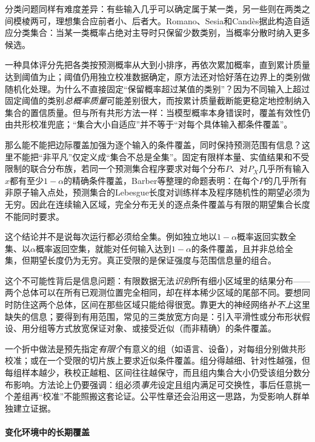 分类问题同样有难度差异：有些输入几乎可以确定属于某一类，另一些则在两类之间模棱两可，理想集合应前者小、后者大。Romano、Sesia和Candès据此构造自适应分类集合：当某一类概率占绝对主导时只保留少数类别，当概率分散时纳入更多候选。

一种具体评分先把各类按预测概率从大到小排序，再依次累加概率，直到累计质量达到阈值为止；阈值仍用独立校准数据确定，原方法还对恰好落在边界上的类别做随机化处理。为什么不直接固定“保留概率超过某值的类别”？因为不同输入上超过固定阈值的类别\emph{总概率质量}可能差别很大，而按累计质量截断能更稳定地控制纳入集合的置信质量。但与所有共形方法一样：当模型概率本身错误时，覆盖有效性仍由共形校准兜底；“集合大小自适应”并不等于“对每个具体输入都条件覆盖”。

那么能不能把边际覆盖加强为逐个输入的条件覆盖，同时保持预测范围有信息？这里不能把“非平凡”仅定义成“集合不总是全集”。固定有限样本量、实值结果和不受限制的联合分布族，若同一个预测集合程序要求对每个分布$P$、对$P_X$几乎所有输入$x$都有至少$1-\alpha$的精确条件覆盖，Barber等整理的命题表明：在每个$P$的几乎所有非原子输入点处，预测集合的Lebesgue长度对训练样本及程序随机性的期望必须为无穷。因此在连续输入区域，完全分布无关的逐点条件覆盖与有限的期望集合长度不能同时要求。

这个结论并不是说每次运行都必须给全集。例如独立地以$1-\alpha$概率返回实数全集、以$\alpha$概率返回空集，就能对任何输入达到$1-\alpha$的条件覆盖，且并非总给全集，但期望长度仍为无穷。真正受限的是保证强度与范围信息量的组合。

这个不可能性背后是信息问题：有限数据无法\emph{识别}所有细小区域里的结果分布——两个总体可以在所有已观测位置完全相同，却在样本稀少区域的尾部不同。要想同时防住这两个总体，区间在那些区域只能给得很宽。靠更大的神经网络\emph{补不上}这里缺失的信息；要得到有用范围，常见的三类放宽方向是：引入平滑性或分布形状假设、用分组等方式放宽保证对象、或接受近似（而非精确）的条件覆盖。

一个折中做法是预先指定\emph{有限个}有意义的组（如语言、设备），对每组分别做共形校准；或在一个受限的切片族上要求近似条件覆盖。组分得越细、针对性越强，但每组样本越少，秩校正越粗、区间往往越保守，而且组内集合大小仍受该组分数分布影响。方法论上仍要强调：组必须\emph{事先}设定且组内满足可交换性，事后任意挑一个差组再“校准”不能照搬这套论证。公平性章还会沿用这一思路，为受影响人群单独建立证据。

\paragraph{变化环境中的长期覆盖}

